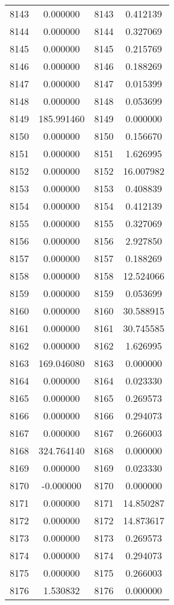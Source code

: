 \documentclass[12pt]{article}
\begin{document}
\begin{longtable}{@{}cccc@{}}
8143 & 0.000000 & 8143 & 0.412139 \\
8144 & 0.000000 & 8144 & 0.327069 \\
8145 & 0.000000 & 8145 & 0.215769 \\
8146 & 0.000000 & 8146 & 0.188269 \\
8147 & 0.000000 & 8147 & 0.015399 \\
8148 & 0.000000 & 8148 & 0.053699 \\
8149 & 185.991460 & 8149 & 0.000000 \\
8150 & 0.000000 & 8150 & 0.156670 \\
8151 & 0.000000 & 8151 & 1.626995 \\
8152 & 0.000000 & 8152 & 16.007982 \\
8153 & 0.000000 & 8153 & 0.408839 \\
8154 & 0.000000 & 8154 & 0.412139 \\
8155 & 0.000000 & 8155 & 0.327069 \\
8156 & 0.000000 & 8156 & 2.927850 \\
8157 & 0.000000 & 8157 & 0.188269 \\
8158 & 0.000000 & 8158 & 12.524066 \\
8159 & 0.000000 & 8159 & 0.053699 \\
8160 & 0.000000 & 8160 & 30.588915 \\
8161 & 0.000000 & 8161 & 30.745585 \\
8162 & 0.000000 & 8162 & 1.626995 \\
8163 & 169.046080 & 8163 & 0.000000 \\
8164 & 0.000000 & 8164 & 0.023330 \\
8165 & 0.000000 & 8165 & 0.269573 \\
8166 & 0.000000 & 8166 & 0.294073 \\
8167 & 0.000000 & 8167 & 0.266003 \\
8168 & 324.764140 & 8168 & 0.000000 \\
8169 & 0.000000 & 8169 & 0.023330 \\
8170 & -0.000000 & 8170 & 0.000000 \\
8171 & 0.000000 & 8171 & 14.850287 \\
8172 & 0.000000 & 8172 & 14.873617 \\
8173 & 0.000000 & 8173 & 0.269573 \\
8174 & 0.000000 & 8174 & 0.294073 \\
8175 & 0.000000 & 8175 & 0.266003 \\
8176 & 1.530832 & 8176 & 0.000000 \\

\end{longtable}
\end{document}
